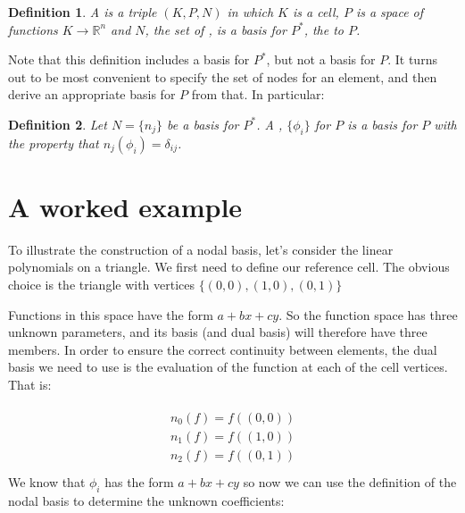 \documentclass{book}
\newtheorem{definition}{Definition}
\begin{document}
\label{\detokenize{2_finite_elements:def-ciarlet}}
\begin{definition}
A  is a triple \((K, P, N)\) in which \(K\) is a cell,
\(P\) is a space of functions \(K\rightarrow\mathbb{R}^n\) and \(N\), the
set of , is a basis for \(P^*\), the  to \(P\).
\end{definition}
Note that this definition includes a basis for \(P^*\), but not a
basis for \(P\). It turns out to be most convenient to specify the set
of nodes for an element, and then derive an appropriate basis for
\(P\) from that. In particular:

\begin{definition}
Let \(N = \{n_j\}\) be a basis for \(P^*\).  A , \(\{\phi_i\}\) for \(P\) is a basis for \(P\)
with the property that \(n_j(\phi_i) = \delta_{ij}\).
\end{definition}

\section{A worked example}
\label{\detokenize{2_finite_elements:a-worked-example}}
To illustrate the construction of a nodal basis, let’s consider the
linear polynomials on a triangle. We first need to define our
reference cell. The obvious choice is the triangle with vertices
\(\{(0,0), (1,0), (0,1)\}\)

Functions in this space have the form \(a + bx + cy\). So the
function space has three unknown parameters, and its basis (and dual
basis) will therefore have three members. In order to ensure the correct
continuity between elements, the dual basis we need to use is the
evaluation of the function at each of the cell vertices. That is:

\label{\detokenize{2_finite_elements:equation-2_finite_elements:0}}\begin{align}\label{equation:2_finite_elements:2_finite_elements:0}\!\begin{aligned}
n_0(f) = f\left((0,0)\right)\\
n_1(f) = f\left((1,0)\right)\\
n_2(f) = f\left((0,1)\right)\\
\end{aligned}\end{align}
We know that \(\phi_i\) has the form \(a + bx + cy\) so now we can
use the definition of the nodal basis to determine the unknown
coefficients:
\end{document}

